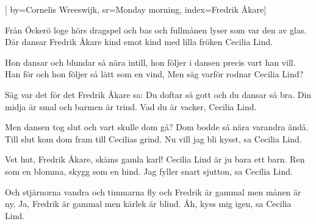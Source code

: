 


[	%
	by={Cornelis Wreeswijk},
	sr={Monday morning},
	index={Fredrik Åkare}]	%
	
\beginverse*		%
Från Öckerö loge hörs dragspel och bas
och fullmånen lyser som var den av glas.
Där dansar Fredrik Åkare kind emot kind
med lilla fröken Cecilia Lind.
\endverse			%

\beginverse*		%
Hon dansar och blundar så nära intill,
hon följer i dansen precis vart han vill.
Han för och hon följer så lätt som en vind,
Men säg varför rodnar Cecilia Lind?
\endverse			%

\beginverse*		%
Säg var det för det Fredrik Åkare sa:
Du doftar så gott och du dansar så bra.
Din midja är smal och barmen är trind.
Vad du är vacker, Cecilia Lind.
\endverse			%

\beginverse*		%
Men dansen tog slut och vart skulle dom gå?
Dom bodde så nära varandra ändå.
Till slut kom dom fram till Cecilias grind.
Nu vill jag bli kysst, sa Cecilia Lind.
\endverse			%

\beginverse*		%
Vet hut, Fredrik Åkare, skäms gamla karl!
Cecilia Lind är ju bara ett barn.
Ren som en blomma, skygg som en hind.
Jag fyller snart sjutton, sa Cecilia Lind.
\endverse			%

\beginverse*		%
Och stjärnorna vandra och timmarna fly
och Fredrik är gammal men månen är ny.
Ja, Fredrik är gammal men kärlek är blind.
Åh, kyss mig igen, sa Cecilia Lind.
\endverse			%
\endsong			%
